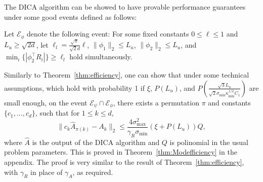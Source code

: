 \documentclass[twoside,11pt]{article}
\newcommand{\Epsi}{\mathcal{E}_{\psi}}
\newcommand{\Ephi}{\mathcal{E}_{\phi}}
\begin{document}
The DICA algorithm can be showed to have provable performance guarantees under some good events defined as follows:
\begin{definition}
Let $\Ephi$ denote the following event:
For some fixed constants $0\le \ell\le 1$ and $L_u \ge \sqrt{2d}$, let $\ell_l = \frac{\sqrt{\pi}}{\sqrt{2}d}\ell$,
$\|\phi_1\|_2 \le L_u$, $\|\phi_2\|_2 \le L_u$, and $\min_i \{|\phi_2^{\top}R_i|\} \ge \ell_l$ hold simultaneously.
\end{definition}  
Similarly to Theorem~\ref{thm:efficiency}, one can show that under some technical assumptions, which 
hold with probability 1 if $\xi$, $P(L_u)$, and $P\left(\frac{\sqrt{3}L_u}{\sqrt{2}\sigma_{\min}\kappa_{\min}^{1/2}C_1}\right)$  are small enough,
on the event $\Epsi \cap\Ephi$,  there exists a permutation $\pi$ and constants $\{c_1,\ldots,c_d\}$, such that for $1\le k\le d$,
\[
\| c_k\hat{A}_{\pi(k)} - A_k\|_2 \le \frac{4\sigma^2_{\max}}{\gamma_R\sigma_{\min}} (\xi + P(L_u))Q,
\]
where $\hat{A}$ is the output of the DICA algorithm and $Q$ is polinomial in the usual problem parameters. %
This is proved in Theorem~\ref{thm:Modefficiency} in the appendix.
The proof is very similar to the result of Theorem~\ref{thm:efficiency}, with $\gamma_R$ in place of $\gamma_A$, as required.
\end{document}
